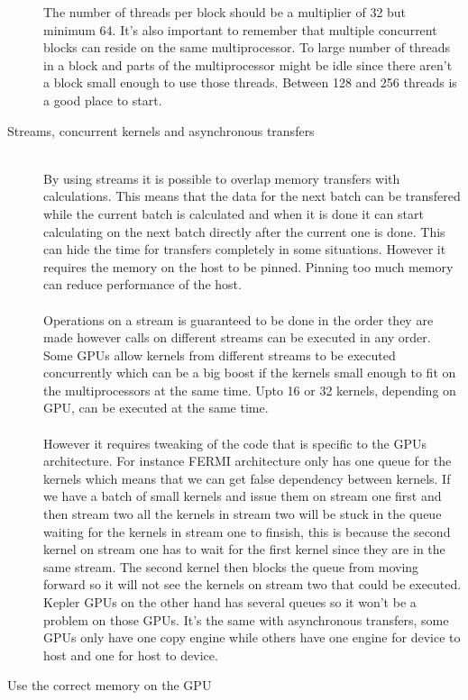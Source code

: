 \documentclass[10pt,a4paper]{report}
\begin{document}
\begin{description}
  The number of threads per block should be a multiplier of 32 but minimum 64. It's also important to remember that multiple concurrent blocks can reside on the same multiprocessor. To large number of threads in a block and parts of the multiprocessor might be idle since there aren't a block small enough to use those threads. Between 128 and 256 threads is a good place to start.\cite{cuda_best_practice}
  \item[Streams, concurrent kernels and asynchronous transfers] \hfill \\
  By using streams it is possible to overlap memory transfers with calculations. This means that the data for the next batch can be transfered while the current batch is calculated and when it is done it can start calculating on the next batch directly after the current one is done. This can hide the time for transfers completely in some situations. However it requires the memory on the host to be pinned. Pinning too much memory can reduce performance of the host.\cite{cuda}\\
  \\
  Operations on a stream is guaranteed to be done in the order they are made however calls on different streams can be executed in any order. Some GPUs allow kernels from different streams to be executed concurrently which can be a big boost if the kernels small enough to fit on the multiprocessors at the same time. Upto 16 or 32 kernels, depending on GPU, can be executed at the same time.\\
  \\
  However it requires tweaking of the code that is specific to the GPUs architecture. For instance FERMI architecture only has one queue for the kernels which means that we can get false dependency between kernels. If we have a batch of small kernels and issue them on stream one first and then stream two all the kernels in stream two will be stuck in the queue waiting for the kernels in stream one to finsish, this is because the second kernel on stream one has to wait for the first kernel since they are in the same stream. The second kernel then blocks the queue from moving forward so it will not see the kernels on stream two that could be executed. Kepler GPUs on the other hand has several queues so it won't be a problem on those GPUs. It's the same with asynchronous transfers, some GPUs only have one copy engine while others have one engine for device to host and one for host to device.\cite{cuda, overlap_transfers_cuda, kepler_tuning_guide}
  \item[Use the correct memory on the GPU] \hfill \\

\end{description}
\end{document}
